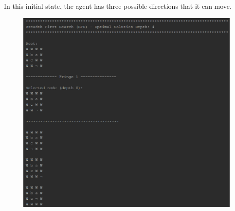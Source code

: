 \documentclass{article}
\begin{document}
	In this initial state, the agent has three possible directions that it can move.
	\begin{figure}[h]
		\centering
		\includegraphics[height=0.75\textheight]{BFS-1-1.png}
	\end{figure}
\end{document}
